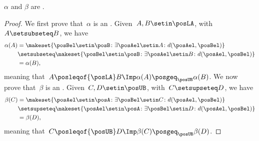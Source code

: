{    \begin{lemma}
        \label{lem:alfabetaantitone}
        $\alpha$ and $\beta$ are .
    \end{lemma}
    \begin{proof}
        We first prove that~$\alpha$ is an .
        Given~$A,B\setin \posLA$, with~$A\setsubseteq B$, we have
        \begin{equation}
            \begin{aligned}
                \alpha(A) & =\makeset{ \posBel\setin \posB \colon \exists \posAel\setin A\colon d(\posAel,\posBel)} \\
                          & \setsubseteq \makeset{\posBel\setin \posB \colon \exists \posAel\setin B\colon d(\posAel,\posBel)} \\
                          & =\alpha(B),
            \end{aligned}
        \end{equation}
        meaning that~$A\posleqof{\posLA}
            B\Imp \alpha(A) \posgeq_{\posUB} \alpha(B)$.
        We now prove that~$\beta$ is an .
        Given~$C,D\setin \posUB$, with~$C\setsupseteq D$, we have
        \begin{equation}
            \begin{aligned}
                \beta(C) & =\makeset{\posAel\setin \posA\colon \exists \posBel\setin C\colon d(\posAel,\posBel)} \\
                         & \setsupseteq \makeset{\posAel\setin \posA\colon \exists \posBel\setin D \colon d(\posAel,\posBel)} \\
                         & =\beta(D),
            \end{aligned}
        \end{equation}
        meaning that~$C\posleqof{\posUB}
            D \Imp \beta(C)\posgeq_{\posUB} \beta(D)$.
    \end{proof}

}

